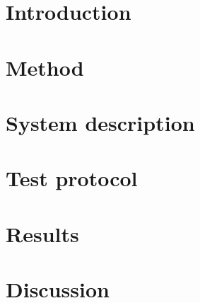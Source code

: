 \documentclass[10pt, titlepage, oneside, a4paper]{article}
\newcommand{\Section}[1]{\section{#1}\vspace{-8pt}}
\begin{document}
    \newpage


    \setlength{\parindent}{0pt}
    \setlength{\parskip}{10pt}

    	\Section{Introduction}
		
	
	\Section{Method}
		

	\Section{System description}
		

	\Section{Test protocol}
		
		
	\Section{Results}
		
		
	\Section{Discussion}
		
\end{document}
